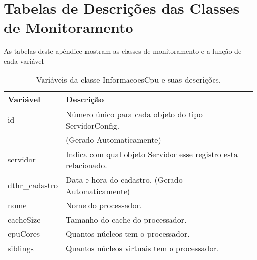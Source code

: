

\chapter{Tabelas de Descrições das Classes de Monitoramento} \label{App:ApendiceA}

As tabelas deste apêndice mostram as classes de monitoramento e a função de cada variável.

\begin{table}[!ht]
\centering
\begin{tabular}{|l|l|}
\hline
{\color[HTML]{000000} \textbf{Variável}} & {\color[HTML]{000000} \textbf{Descrição}}                                      \\ \hline
id                                       & Número único para cada objeto do tipo ServidorConfig.\\ 
																				 &(Gerado Automaticamente) 																												\\ \hline
servidor                                 & Indica com qual objeto Servidor esse registro esta relacionado.                       \\ \hline
dthr\_cadastro                           & Data e hora do cadastro. (Gerado Automaticamente)                              \\ \hline
nome                                     & Nome do processador.                                                           \\ \hline
cacheSize                                & Tamanho do cache do processador.                                               \\ \hline
cpuCores                                 & Quantos núcleos tem o processador.                                             \\ \hline
siblings                                 & Quantos núcleos virtuais tem o processador.                                    \\ \hline
\end{tabular}
\caption[Variáveis da classe InformacoesCpu e suas descrições.]{Variáveis da classe InformacoesCpu e suas descrições.}
\label{Tab:VariaveisInformacoesCpu}
\end{table}



